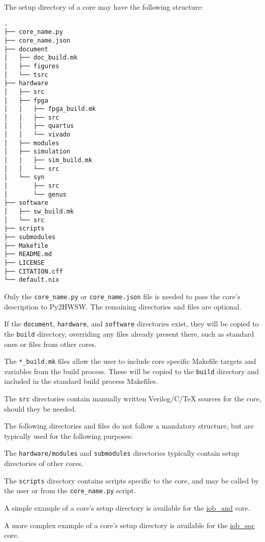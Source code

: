 %

The setup directory of a core may have the following structure:

\begin{verbatim}
.
├── core_name.py
├── core_name.json
├── document
│   ├── doc_build.mk
│   ├── figures
│   └── tsrc
├── hardware
│   ├── src
│   ├── fpga
│   │   ├── fpga_build.mk
│   │   ├── src
│   │   ├── quartus
│   │   └── vivado
│   ├── modules
│   ├── simulation
│   │   ├── sim_build.mk
│   │   └── src
│   └── syn
│       ├── src
│       └── genus
├── software
│   ├── sw_build.mk
│   └── src
├── scripts
├── submodules
├── Makefile
├── README.md
├── LICENSE
├── CITATION.cff
└── default.nix
\end{verbatim}

Only the \texttt{core\_name.py} or \texttt{core\_name.json} file is needed to
pass the core's description to Py2HWSW.  The remaining directories and files are
optional.

If the \texttt{document}, \texttt{hardware}, and \texttt{software} directories
exist, they will be copied to the \texttt{build} directory, overriding any files
already present there, such as standard ones or files from other cores.

The \texttt{*\_build.mk} files allow the user to include core specific Makefile
targets and variables from the build process.  These will be copied to the
\texttt{build} directory and included in the standard build process Makefiles.

The \texttt{src} directories contain manually written Verilog/C/TeX sources for
the core, should they be needed.

The following directories and files do not follow a mandatory structure, but are
typically used for the following purposes:

The \texttt{hardware/modules} and \texttt{submodules} directories typically
contain setup directories of other cores.

The \texttt{scripts} directory contains scripts specific to the core, and may be
called by the user or from the \texttt{core\_name.py} script.

A simple example of a core's setup directory is available for the
\href{https://github.com/IObundle/py2hwsw/tree/main/py2hwsw/lib/hardware/basic_tests/iob_and}{iob\_and}
core.

A more complex example of a core's setup directory is available for the
\href{https://github.com/IObundle/iob-soc}{iob\_soc} core.
